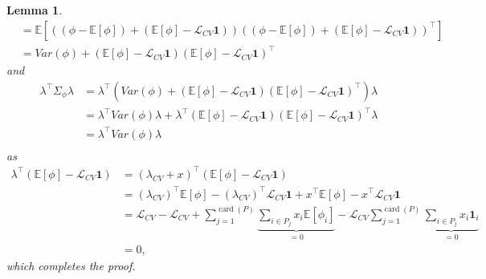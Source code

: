 \documentclass[11pt,dvipsnames]{article}
\newtheorem{lemma}{Lemma}
\DeclareMathOperator{\cardt}{card}
\begin{document}
\begin{appendices}
\begin{lemma}
\begin{equation}
\begin{split}
&=\mathbb{E}[\left( \left( \phi- \mathbb{E}[\phi]\right) +\left(  \mathbb{E}[\phi]-\mathcal{L}_{CV}\mathbf{1}\right) \right) \left( \left( \phi- \mathbb{E}[\phi]\right) +\left(  \mathbb{E}[\phi]-\mathcal{L}_{CV}\mathbf{1}\right) \right)^{\top} ]\\
&=Var(\phi)+\left(  \mathbb{E}[\phi]-\mathcal{L}_{CV}\mathbf{1}\right)\left(  \mathbb{E}[\phi]-\mathcal{L}_{CV}\mathbf{1}\right)^{\top}
\end{split}
\end{equation}
and 
\begin{equation}
\begin{split}
\lambda^{\top}\Sigma_{\phi}\lambda
&=\lambda^{\top}\left( Var(\phi)+\left(  \mathbb{E}[\phi]-\mathcal{L}_{CV}\mathbf{1}\right)\left(  \mathbb{E}[\phi]-\mathcal{L}_{CV}\mathbf{1}\right)^{\top} \right)  \lambda \\
&=\lambda^{\top}Var(\phi)\lambda+\lambda^{\top}\left(  \mathbb{E}[\phi]-\mathcal{L}_{CV}\mathbf{1}\right)\left(  \mathbb{E}[\phi]-\mathcal{L}_{CV}\mathbf{1}\right)^{\top}  \lambda \\
&=\lambda^{\top}Var(\phi)\lambda \\
\end{split}
\end{equation}
as 
\begin{equation}
\begin{split}
\lambda^{\top}\left(  \mathbb{E}[\phi]-\mathcal{L}_{CV}\mathbf{1}\right)
&=\left(\lambda_{CV}+x \right) ^{\top}\left(  \mathbb{E}[\phi]-\mathcal{L}_{CV}\mathbf{1}\right)\\
&=\left(\lambda_{CV}\right)^{\top}\mathbb{E}[\phi]-\left(\lambda_{CV}\right)^{\top}\mathcal{L}_{CV}\mathbf{1}+x^{\top}\mathbb{E}[\phi]-x^{\top}\mathcal{L}_{CV}\mathbf{1}\\
&=\mathcal{L}_{CV}-\mathcal{L}_{CV}+\sum_{j=1}^{\cardt(P)}\underbrace{\sum_{i\in P_{j}}x_{i}\mathbb{E}[\phi_{i}]}_{=0}-\mathcal{L}_{CV}\sum_{j=1}^{\cardt(P)}\underbrace{\sum_{i\in P_{j}}x_{i}\mathbf{1}_{i}}_{=0}\\
&=0,
\end{split}
\end{equation}
which completes the proof.
\end{lemma}




\end{appendices}
\end{document}
